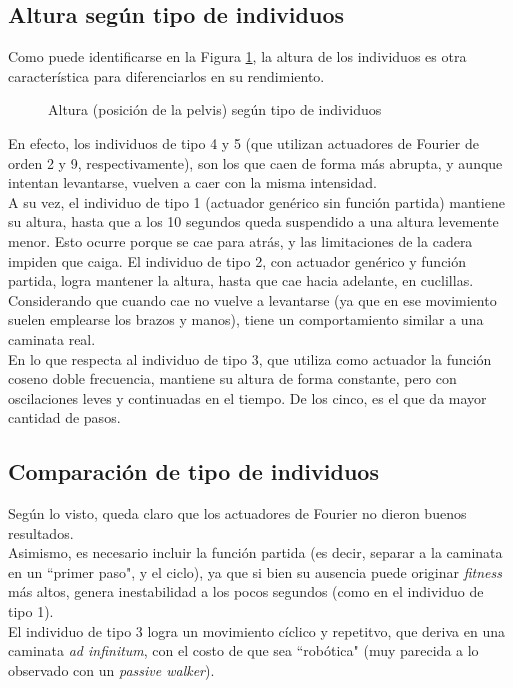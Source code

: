 \documentclass{article}
\begin{document}
\subsection{Altura seg\'un tipo de individuos}
Como puede identificarse en la Figura \ref{fig:resultados_altura}, la altura de los individuos es otra caracter\'istica para diferenciarlos en su rendimiento.
\begin{figure}[H]%
  \centering
  \caption{Altura (posici\'on de la pelvis) seg\'un tipo de individuos}%
  \label{fig:resultados_altura} %
\end{figure}
\noindent En efecto, los individuos de tipo 4 y 5 (que utilizan actuadores de Fourier de orden 2 y 9, respectivamente), son los que caen de forma m\'as abrupta, y aunque intentan levantarse, vuelven a caer con la misma intensidad. \\
A su vez, el individuo de tipo 1 (actuador gen\'erico sin funci\'on partida) mantiene su altura, hasta que a los 10 segundos queda suspendido a una altura levemente menor. Esto ocurre porque se cae para atr\'as, y las limitaciones de la cadera impiden que caiga. El individuo de tipo 2, con actuador gen\'erico y funci\'on partida, logra mantener la altura, hasta que cae hacia adelante, en cuclillas. Considerando que cuando cae no vuelve a levantarse (ya que en ese movimiento suelen emplearse los brazos y manos), tiene un comportamiento similar a una caminata real. \\
En lo que respecta al individuo de tipo 3, que utiliza como actuador la funci\'on coseno doble frecuencia, mantiene su altura de forma constante, pero con oscilaciones leves y continuadas en el tiempo. De los cinco, es el que da mayor cantidad de pasos.


\subsection{Comparaci\'on de tipo de individuos}
Seg\'un lo visto, queda claro que los actuadores de Fourier no dieron buenos resultados.\\
Asimismo, es necesario incluir la funci\'on partida (es decir, separar a la caminata en un ``primer paso", y el ciclo), ya que si bien su ausencia puede originar \textit{fitness} m\'as altos, genera inestabilidad a los pocos segundos (como en el individuo de tipo 1).\\
El individuo de tipo 3 logra un movimiento c\'iclico y repetitvo, que deriva en una caminata \textit{ad infinitum}, con el costo de que sea ``rob\'otica" (muy parecida a lo observado con un \textit{passive walker}). 
\end{document}
